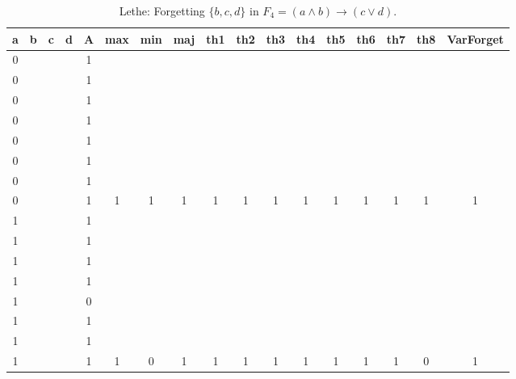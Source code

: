 \begin{table}[!tb]
    \centering
    \begin{tabular}{|c|c|c|c|c|c|c|c|c|c|c|c|c|c|c|c|c|}
        \hline
        \textbf{a} & \textbf{b} & \textbf{c} & \textbf{d} & \textbf{A} & \textbf{max} & \textbf{min} & \textbf{maj} & \textbf{th1} & \textbf{th2} & \textbf{th3} & \textbf{th4} & \textbf{th5} & \textbf{th6} & \textbf{th7} & \textbf{th8} & \textbf{VarForget} \\ \hline
        \rowcolor{gray!40} 0 &  &  &  & 1 &  &  &  &  &  &  &  &  &  &  &  &  \\ \hline
        \rowcolor{gray!40} 0 &  &  &  & 1 &  &  &  &  &  &  &  &  &  &  &  &  \\ \hline
        \rowcolor{gray!40} 0 &  &  &  & 1 &  &  &  &  &  &  &  &  &  &  &  &  \\ \hline
        \rowcolor{gray!40} 0 &  &  &  & 1 &  &  &  &  &  &  &  &  &  &  &  &  \\ \hline
        \rowcolor{gray!40} 0 &  &  &  & 1 &  &  &  &  &  &  &  &  &  &  &  &  \\ \hline
        \rowcolor{gray!40} 0 &  &  &  & 1 &  &  &  &  &  &  &  &  &  &  &  &  \\ \hline
        \rowcolor{gray!40} 0 &  &  &  & 1 &  &  &  &  &  &  &  &  &  &  &  &  \\ \hline
        \rowcolor{gray!40} 0 &  &  &  & 1 & 1 & 1 & 1 & 1 & 1 & 1 & 1 & 1 & 1 & 1 & 1 & 1 \\ \hline
        \rowcolor{blue!40} 1 &  &  &  & 1 &  &  &  &  &  &  &  &  &  &  &  &  \\ \hline
        \rowcolor{blue!40} 1 &  &  &  & 1 &  &  &  &  &  &  &  &  &  &  &  &  \\ \hline
        \rowcolor{blue!40} 1 &  &  &  & 1 &  &  &  &  &  &  &  &  &  &  &  &  \\ \hline
        \rowcolor{blue!40} 1 &  &  &  & 1 &  &  &  &  &  &  &  &  &  &  &  &  \\ \hline
        \rowcolor{blue!40} 1 &  &  &  & 0 &  &  &  &  &  &  &  &  &  &  &  &  \\ \hline
        \rowcolor{blue!40} 1 &  &  &  & 1 &  &  &  &  &  &  &  &  &  &  &  &  \\ \hline
        \rowcolor{blue!40} 1 &  &  &  & 1 &  &  &  &  &  &  &  &  &  &  &  &  \\ \hline
        \rowcolor{blue!40} 1 &  &  &  & 1 & 1 & 0 & 1 & 1 & 1 & 1 & 1 & 1 & 1 & 1 & 0 & 1 \\ \hline
    \end{tabular}
    \caption{Lethe: Forgetting $\{b, c, d\}$ in $F_{4} = (a \land b) \rightarrow (c \lor d)$.}
    \label{tab:lethe-F4-bcd}
\end{table}

